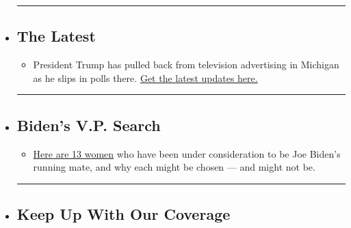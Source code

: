 \begin{itemize}
\item
  \begin{center}\rule{0.5\linewidth}{\linethickness}\end{center}

  \hypertarget{the-latest}{%
  \subsection{The Latest}\label{the-latest}}

  \begin{itemize}
  \tightlist
  \item
    President Trump has pulled back from television advertising in
    Michigan as he slips in polls there.
    \href{https://www.nytimes3xbfgragh.onion/2020/07/29/us/elections/biden-vs-trump.html?action=click\&pgtype=Article\&state=default\&region=BELOW_MAIN_CONTENT\&context=storylines_guide}{Get
    the latest updates here.}
  \end{itemize}
\item
  \begin{center}\rule{0.5\linewidth}{\linethickness}\end{center}

  \hypertarget{bidens-vp-search}{%
  \subsection{Biden's V.P. Search}\label{bidens-vp-search}}

  \begin{itemize}
  \tightlist
  \item
    \href{https://www.nytimes3xbfgragh.onion/article/biden-vice-president-2020.html?action=click\&pgtype=Article\&state=default\&region=BELOW_MAIN_CONTENT\&context=storylines_guide}{Here
    are 13 women} who have been under consideration to be Joe Biden's
    running mate, and why each might be chosen --- and might not be.
  \end{itemize}
\item
  \begin{center}\rule{0.5\linewidth}{\linethickness}\end{center}

  \hypertarget{keep-up-with-our-coverage}{%
  \subsection{Keep Up With Our
  Coverage}\label{keep-up-with-our-coverage}}


\end{itemize}
